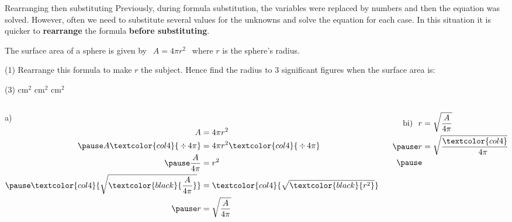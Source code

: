 \documentclass[aspectratio=169,10pt]{beamer}
\begin{document}
\begin{frame}{Rearranging then substituting}
Previously, during formula substitution, the variables were replaced by numbers and then the equation was solved. However, often we need to substitute several values for the unknowns and solve the equation for each case. In this situation it is quicker to \textbf{rearrange} the formula \textbf{before substituting}.
\end{frame}

\begin{frame}
\small
  \begin{example}
    The surface area of a sphere is given by $\ \ A=4\pi r^2\ \ $ where $r$ is the sphere's radius.
    \begin{tasks}(1)
      \task Rearrange this formula to make $r$ the subject.
      \task Hence find the radius to 3 significant figures when the surface area is:
    \end{tasks}
    \begin{tasks}(3)
         cm$^2$
         cm$^2$
         cm$^2$
    \end{tasks}
  \end{example}\pause
  \begin{solution}[]
  \vspace{-1em}
    \begin{columns}[t]
      \begin{column}{.22\textwidth}
      a)\vspace{-2em}
        \[
        \begin{aligned}
          A&=4\pi r^2\\\pause
          A\textcolor{col4}{\,\div\,4\pi}&=4\pi r^2\textcolor{col4}{\,\div\,4\pi}\\\pause
          \frac{A}{4\pi}&=r^2\\\pause
          \textcolor{col4}{\sqrt{\textcolor{black}{\frac{A}{4\pi}}}}&=\textcolor{col4}{\sqrt{\textcolor{black}{r^2}}}\\\pause
          r&=\sqrt{\frac{A}{4\pi}}&(r>0)\pause
        \end{aligned}
        \]
      \end{column}
      \begin{column}{.2\textwidth}
        \vspace{-2em}
        \[
        \begin{aligned}
          \text{bi) }\  r&=\sqrt{\frac{A}{4\pi}}\\\pause
          r&=\sqrt{\frac{\textcolor{col4}{10}}{4\pi}}\\\pause

\end{aligned}\]
\end{column}
\end{columns}
\end{solution}
\end{frame}
\end{document}
